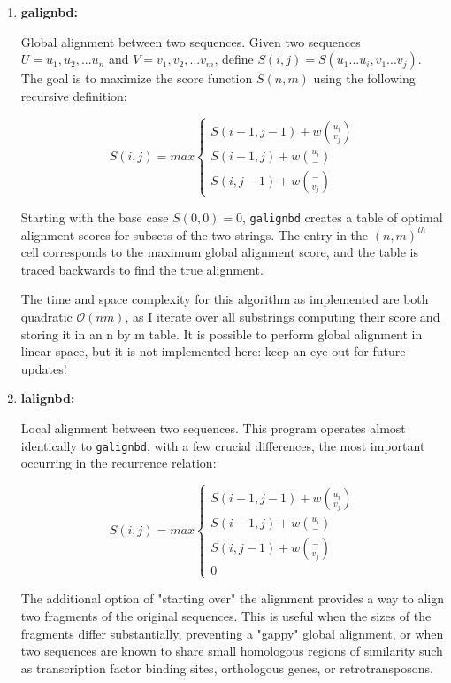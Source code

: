 \documentclass[11pt]{article}
\newcommand{\prog}[1]{\texttt{#1}}
\begin{document}
\begin{enumerate}
\item{\bf{galignbd}:}

Global alignment between two sequences.  Given two sequences $U=u_1,u_2,...u_n$
and $V=v_1,v_2,...v_m$, define $S(i,j)=S(u_1...u_i,v_1...v_j)$. The goal is to
maximize the score function $S(n,m)$ using the following recursive definition:

\begin{displaymath}
S(i,j) = max\left\{
  \begin{array}{lr}
    S(i-1,j-1) + w{u_i\choose v_j}\\
    S(i-1,j) + w{u_i\choose -} \\
    S(i,j-1) + w{-\choose v_j}
    \end{array}
    \right.
\end{displaymath}

Starting with the base case $S(0,0)=0$, \prog{galignbd} creates a table of
optimal alignment scores for subsets of the two strings. The entry in the
$(n,m)^{th}$ cell corresponds to the maximum global alignment score, and the
table is traced backwards to find the true alignment.

The time and space complexity for this algorithm as implemented are both
quadratic $\mathcal{O}(nm)$, as I iterate over all substrings computing their
score and storing it in an n by m table.  It is possible to perform global
alignment in linear space, but it is not implemented here: keep an eye
out for future updates!

\item{\bf{lalignbd}:}

Local alignment between two sequences. This program operates almost
identically to \prog{galignbd}, with a few crucial differences, the
most important occurring in the recurrence relation:

\begin{displaymath}
S(i,j) = max\left\{
  \begin{array}{lr}
    S(i-1,j-1) + w{u_i\choose v_j}\\
    S(i-1,j) + w{u_i\choose -} \\
    S(i,j-1) + w{-\choose v_j} \\
    0
    \end{array}
    \right.
\end{displaymath}

The additional option of "starting over" the alignment provides a
way to align two fragments of the original sequences. This is useful
when the sizes of the fragments differ substantially, preventing a
"gappy" global alignment, or when two sequences are known to share
small homologous regions of similarity such as transcription factor
binding sites, orthologous genes, or retrotransposons.


\end{enumerate}
\end{document}
